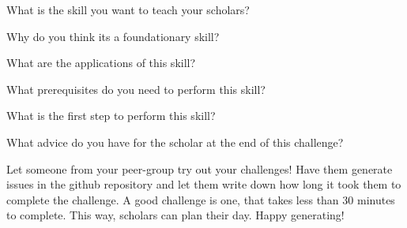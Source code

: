 \begin{challenge}
\begin{task}
        \begin{questions}
            \item What is the skill you want to teach your scholars?
            \item Why do you think its a foundationary skill?
            \item What are the applications of this skill?
            \item What prerequisites do you need to perform this skill?
            \item What is the first step to perform this skill?
            \item What advice do you have for the scholar at the end of this challenge?
        \end{questions}
    \end{task}

    \begin{advice}
        Let someone from your peer-group try out your challenges!
        Have them generate issues in the github repository and let them write down how long it took them to complete the challenge.
        A good challenge is one, that takes less than 30 minutes to complete.
        This way, scholars can plan their day.
        Happy generating!
    \end{advice}
\end{challenge}
